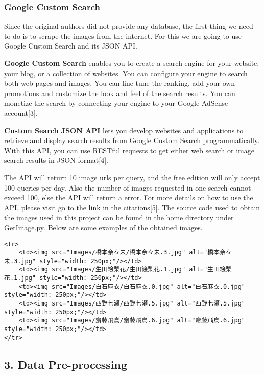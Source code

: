 \documentclass[11pt]{article}
\begin{document}
    \subsubsection{Google Custom Search}\label{google-custom-search}

Since the original authors did not provide any database, the first thing
we need to do is to scrape the images from the internet. For this we are
going to use Google Custom Search and its JSON API.

\textbf{Google Custom Search} enables you to create a search engine for
your website, your blog, or a collection of websites. You can configure
your engine to search both web pages and images. You can fine-tune the
ranking, add your own promotions and customize the look and feel of the
search results. You can monetize the search by connecting your engine to
your Google AdSense account{[}3{]}.

\textbf{Custom Search JSON API} lets you develop websites and
applications to retrieve and display search results from Google Custom
Search programmatically. With this API, you can use RESTful requests to
get either web search or image search results in JSON format{[}4{]}.

    The API will return 10 image urls per query, and the free edition will
only accept 100 queries per day. Also the number of images requested in
one search cannot exceed 100, else the API will return a error. For more
details on how to use the API, please visit go to the link in the
citations{[}5{]}. The source code used to obtain the images used in this
project can be found in the home directory under GetImage.py. Below are
some examples of the obtained images.

    \begin{verbatim}
<tr>
    <td><img src="Images/橋本奈々未/橋本奈々未.3.jpg" alt="橋本奈々未.3.jpg" style="width: 250px;"/></td>
    <td><img src="Images/生田絵梨花/生田絵梨花.1.jpg" alt="生田絵梨花.1.jpg" style="width: 250px;"/></td>
    <td><img src="Images/白石麻衣/白石麻衣.0.jpg" alt="白石麻衣.0.jpg" style="width: 250px;"/></td>
    <td><img src="Images/西野七瀬/西野七瀬.5.jpg" alt="西野七瀬.5.jpg" style="width: 250px;"/></td>
    <td><img src="Images/齋藤飛鳥/齋藤飛鳥.6.jpg" alt="齋藤飛鳥.6.jpg" style="width: 250px;"/></td>
</tr>
\end{verbatim}

    \subsection{3. Data Pre-processing}\label{data-pre-processing}
\end{document}
